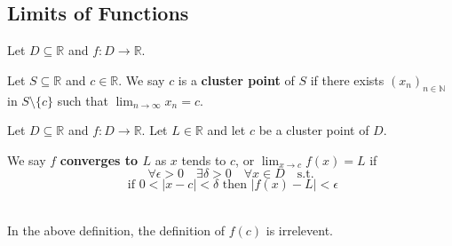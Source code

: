 \subsection{Limits of Functions}


Let $D \subseteq \mathbb{R}$ and $f : D \rightarrow \mathbb{R}$.

\begin{definition}
  Let $S \subseteq \mathbb{R}$ and $c \in \mathbb{R}$. We say $c$ is a {\bf cluster point} of $S$ if there exists $(x_n)_{n \in \mathbb{N}}$ in $S \setminus \{c\}$ such that $\lim_{n \rightarrow \infty} x_n = c$.
\end{definition}
\begin{definition}
  Let $D \subseteq \mathbb{R}$ and $f : D \rightarrow \mathbb{R}$. Let $L \in \mathbb{R}$ and let $c$ be a cluster point of $D$.

  We say { $f$ \bf converges to $L$} as $x$ tends to $c$, or $\lim_{x \rightarrow c} f(x) = L$ if
  \[\forall \epsilon >0 \quad \exists \delta > 0 \quad \forall x \in D \quad \text{s.t.}\]
  \[ \text{ if } 0 < | x - c| < \delta \text{ then } |f(x) - L | < \epsilon\]
\end{definition}
$ $ \\
In the above definition, the definition of $f(c)$ is irrelevent.

